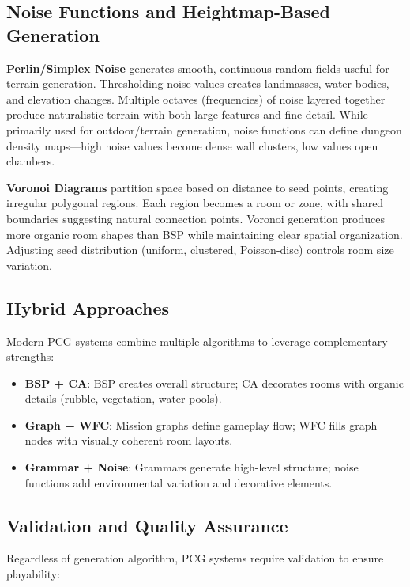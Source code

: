 \documentclass[11pt]{article}
\begin{document}
\subsection{Noise Functions and Heightmap-Based Generation}

\textbf{Perlin/Simplex Noise} generates smooth, continuous random fields useful for terrain generation. Thresholding noise values creates landmasses, water bodies, and elevation changes. Multiple octaves (frequencies) of noise layered together produce naturalistic terrain with both large features and fine detail. While primarily used for outdoor/terrain generation, noise functions can define dungeon density maps—high noise values become dense wall clusters, low values open chambers.

\textbf{Voronoi Diagrams} partition space based on distance to seed points, creating irregular polygonal regions. Each region becomes a room or zone, with shared boundaries suggesting natural connection points. Voronoi generation produces more organic room shapes than BSP while maintaining clear spatial organization. Adjusting seed distribution (uniform, clustered, Poisson-disc) controls room size variation.

\subsection{Hybrid Approaches}

Modern PCG systems combine multiple algorithms to leverage complementary strengths:

\begin{itemize}
    \item \textbf{BSP + CA}: BSP creates overall structure; CA decorates rooms with organic details (rubble, vegetation, water pools).
    \item \textbf{Graph + WFC}: Mission graphs define gameplay flow; WFC fills graph nodes with visually coherent room layouts.
    \item \textbf{Grammar + Noise}: Grammars generate high-level structure; noise functions add environmental variation and decorative elements.
\end{itemize}

\subsection{Validation and Quality Assurance}

Regardless of generation algorithm, PCG systems require validation to ensure playability:
\end{document}
